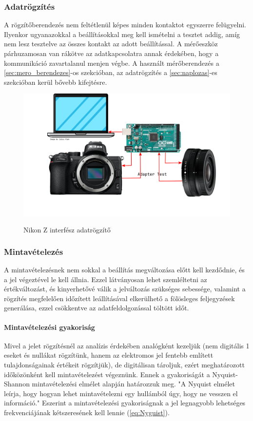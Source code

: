 \subsubsection{Adatrögzítés}
A rögzítőberendezés nem feltétlenül képes minden kontaktot egyszerre felügyelni.
Ilyenkor ugyanazokkal a beállításokkal meg kell ismételni a tesztet addig, amíg nem lesz tesztelve az összes kontakt az adott beállítással.
A mérőeszköz párhuzamosan van rákötve az adatkapcsolatra annak érdekében, hogy a kommunikáció zavartalanul menjen végbe.
A használt mérőberendezés a \ref{sec:mero_berendezes}-os szekcióban, az adatrögzítés a \ref{sec:naplozas}-es szekcióban kerül bővebb kifejtésre.
\begin{figure}[H]
	\centering
	\includegraphics[width=0.9\linewidth]{img/rajz.png}
    \cite{Nikon_Z}\cite{Nikon_Z_16-50}
	\caption{Nikon Z interfész adatrögzítő}
	\label{fig:rogzito}
\end{figure}
\subsubsection{Mintavételezés}
A mintavételezésnek nem sokkal a beállítás megváltozása előtt kell kezdődnie, és a jel végeztével le kell állnia. Ezzel látványosan lehet szemléltetni az értékváltozást, és kinyerhetővé válik a jelváltozás szükséges sebessége, valamint a rögzítés megfelelően időzített leállításával elkerülhető a fölösleges feljegyzések generálása, ezzel csökkentve az adatfeldolgozással töltött időt.
\paragraph{Mintavételezési gyakoriság}
Mivel a jelet rögzítésnél az analízis érdekében analógként kezeljük (nem digitális 1 eseket és nullákat rögzítünk, hanem az elektromos jel fentebb említett tulajdonságainak értékeit rögzítjük), de digitálisan tároljuk, ezért meghatározott időközönként kell mintavételezést végeznünk. Ennek a gyakoriságát a Nyquist-Shannon mintavételezési elmélet alapján határozzuk meg. "A Nyquist elmélet leírja, hogy hogyan lehet mintavételezni egy hullámból úgy, hogy ne vesszen el információ."\cite{por2019nyquist} Eszerint a mintavételezési gyakoriságnak a jel legnagyobb lehetséges frekvenciájának kétszeresének kell lennie (\ref{eq:Nyguist})\cite{por2019nyquist}.

